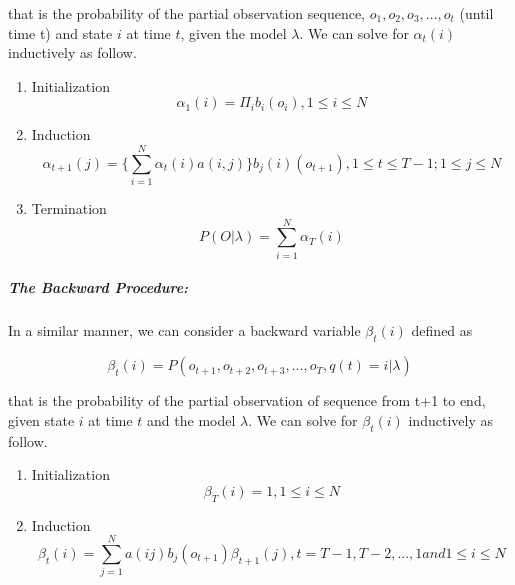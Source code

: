 that is the probability of the partial observation sequence, $o _{1}, o _{2},o _{3},...,o _{t}$ (until time t) and
state $i$ at time $t$, given the model $\lambda$. We can solve for $\alpha _{t} (i)$ inductively as follow.
\begin{enumerate}
	\item Initialization 
	\begin{equation} \alpha_{1}(i) = \Pi_{i}b_{i}(o_{i}), 1 \leq i \leq N  \end{equation}
	
	\item Induction
	\begin{equation} \alpha_{t+1}(j) = \{ \sum_{i=1}^{N}\alpha_{t}(i)a(i,j) \} b_{j}(i)(o_{t+1}) ,1 \leq t \leq T-1 ; 1 \leq j \leq N \end{equation}
	
	\item Termination
	\begin{equation} P(O|\lambda) = \sum_{i=1}^{N} \alpha_{T}(i) \end{equation}
\end{enumerate}

\subparagraph{The Backward Procedure:}
In a similar manner, we can consider a backward variable $ \beta_{t}(i) $ defined as 

\begin{equation} \beta _{t} (i) = P(o _{t+1}, o _{t+2},o _{t+3},...,o _{T},q(t) = i|\lambda)  \end{equation}

that is the probability of the partial observation of sequence from t+1 to end, given state $i$ at time $t$ and the model $\lambda$. We can solve for $\beta _{t} (i)$ inductively as follow.
\begin{enumerate}
	\item Initialization 
	\begin{equation} \beta_{T}(i) = 1, 1 \leq i \leq N  \end{equation}
	
	\item Induction
	\begin{equation} \beta_{t}(i) =  \sum_{j=1}^{N}a(ij) b_{j}(o_{t+1})\beta_{t+1}(j) , t = T-1, T-2, ... , 1  and  1 \leq i \leq N \end{equation}
	
\end{enumerate}

